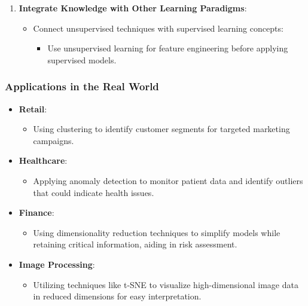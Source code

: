 \documentclass[aspectratio=169]{beamer}
\begin{document}
\begin{frame}[fragile]
\begin{enumerate}
        \item \textbf{Integrate Knowledge with Other Learning Paradigms}:
        \begin{itemize}
            \item Connect unsupervised techniques with supervised learning concepts:
            \begin{itemize}
                \item Use unsupervised learning for feature engineering before applying supervised models.
            \end{itemize}
        \end{itemize}
    \end{enumerate}
\end{frame}

\begin{frame}[fragile]
    \frametitle{Applications in the Real World}
    \begin{itemize}
        \item \textbf{Retail}:
        \begin{itemize}
            \item Using clustering to identify customer segments for targeted marketing campaigns.
        \end{itemize}
        
        \item \textbf{Healthcare}:
        \begin{itemize}
            \item Applying anomaly detection to monitor patient data and identify outliers that could indicate health issues.
        \end{itemize}

        \item \textbf{Finance}:
        \begin{itemize}
            \item Using dimensionality reduction techniques to simplify models while retaining critical information, aiding in risk assessment.
        \end{itemize}

        \item \textbf{Image Processing}:
        \begin{itemize}
            \item Utilizing techniques like t-SNE to visualize high-dimensional image data in reduced dimensions for easy interpretation.
        \end{itemize}
    \end{itemize}
\end{frame}
\end{document}
